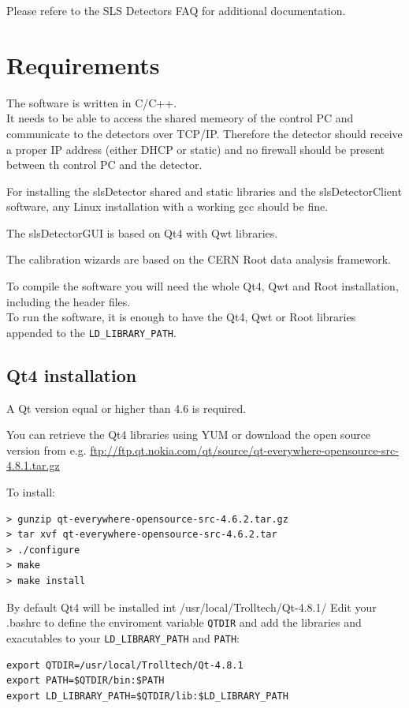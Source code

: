 \documentclass{article}
\begin{document}
Please refere to the SLS Detectors FAQ for additional documentation.

\section{Requirements}

The software is written in C/C++.\\
It needs to be able to access the shared memeory of the control PC and communicate to the detectors over TCP/IP. Therefore the detector should receive a proper IP address (either DHCP or static) and no firewall should be present between th control PC and the detector.

For installing the slsDetector shared and static libraries and the slsDetectorClient software, any Linux installation with a working gcc should be fine.

The slsDetectorGUI is based on Qt4 with Qwt libraries.

The calibration wizards are based on the CERN Root data analysis framework.

To compile the software you will need the whole Qt4, Qwt and Root installation, including the header files.\\
To run the software, it is enough to have the Qt4, Qwt or Root libraries appended to the  \verb=LD_LIBRARY_PATH=.

\subsection{Qt4 installation}

A Qt version equal or higher than 4.6 is required.

You can retrieve the Qt4 libraries using YUM or download the open source version from e.g. \url{ftp://ftp.qt.nokia.com/qt/source/qt-everywhere-opensource-src-4.8.1.tar.gz}

To install:
\begin{verbatim}
> gunzip qt-everywhere-opensource-src-4.6.2.tar.gz
> tar xvf qt-everywhere-opensource-src-4.6.2.tar
> ./configure
> make
> make install
\end{verbatim}

By default Qt4 will be installed int /usr/local/Trolltech/Qt-4.8.1/
Edit your .bashrc to define the enviroment variable  \verb=QTDIR= and add the libraries and exacutables to your \verb=LD_LIBRARY_PATH= and \verb=PATH=:
\begin{verbatim}
export QTDIR=/usr/local/Trolltech/Qt-4.8.1
export PATH=$QTDIR/bin:$PATH
export LD_LIBRARY_PATH=$QTDIR/lib:$LD_LIBRARY_PATH
\end{verbatim}
\end{document}
